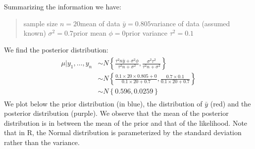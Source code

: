 \documentclass[letterpaper,10pt,english]{jupyterBook}
\begin{document}
\sphinxAtStartPar
Summarizing the information we have:
\begin{quote}

\sphinxAtStartPar
sample size \(n = 20\)mean of data \(\bar{y} = 0.805\)variance of data (assumed known) \(\sigma^2 = 0.7\)prior mean \( \phi = 0\)prior variance \(\tau^2= 0.1\)
\end{quote}

\sphinxAtStartPar
We find the posterior distribution:
\begin{equation*}
\begin{split}
\begin{align*}
\mu \vert y_1,\dots,y_n &\sim N\left\{ \frac{ \tau^2 n\bar{y} + \sigma^2\phi }{\tau^2 n + \sigma^2}, \frac{\sigma^2\tau^2}{\tau^2n+\sigma^2} \right\} \\
 &\sim N\left\{ \frac{ 0.1 \times 20 \times 0.805 + 0 }{0.1 \times 20 + 0.7}, \frac{0.7 \times 0.1}{0.1 \times 20 +0.7 } \right\} \\
  &\sim N\left\{ 0.596, 0.0259 \right\}
\end{align*}
\end{split}
\end{equation*}
\sphinxAtStartPar
We plot below the prior distribution (in blue), the distribution of \(\bar{y}\) (red) and the posterior distribution (purple). We observe that the mean of the posterior distribution is in between the mean of the prior and that of the likelihood. Note that in R, the Normal distribution is parameterized by the standard deviation rather than the variance.
\end{document}
